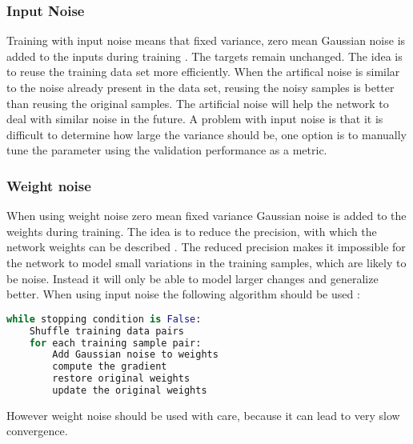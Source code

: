 \subsubsection{Input Noise}
Training with input noise means that fixed variance, zero mean Gaussian noise is added to the inputs during training \cite[page 32]{Graves2012}. The targets remain unchanged. The idea is to reuse the training data set more efficiently. When the artifical noise is similar to the noise already present in the data set, reusing the noisy samples is better than reusing the original samples. The artificial noise will help the network to deal with similar noise in the future.
A problem with input noise is that it is difficult to determine how large the variance should be, one option is to manually tune the parameter using the validation performance as a metric.

\subsubsection{Weight noise}
When using weight noise zero mean fixed variance Gaussian noise is added to the weights during training. The idea is to reduce the precision, with which the network weights can be described \cite[page 32]{Graves2012}. The reduced precision makes it impossible for the network to model small variations in the training samples, which are likely to be noise. Instead it will only be able to model larger changes and generalize better.
When using input noise the following algorithm should be used \cite[page 33]{Graves2012}:
\begin{lstlisting}[language=python]
while stopping condition is False:
    Shuffle training data pairs
    for each training sample pair:
        Add Gaussian noise to weights
        compute the gradient
        restore original weights
        update the original weights
\end{lstlisting}
However weight noise should be used with care, because it can lead to very slow convergence.

